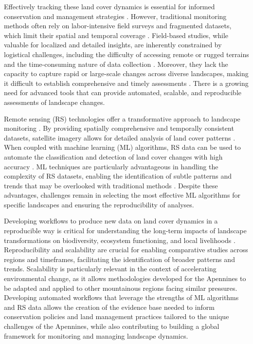 \documentclass[remotesensing,article,submit,pdftex,moreauthors]{Definitions/mdpi}
\begin{document}
Effectively tracking these land cover dynamics is essential for informed conservation and management strategies \cite{gutman2004land, AMICI201738}. However, traditional monitoring methods often rely on labor-intensive field surveys and fragmented datasets, which limit their spatial and temporal coverage \cite{Lelli2018,Lelli,GLASER2024108798}. Field-based studies, while valuable for localized and detailed insights, are inherently constrained by logistical challenges, including the difficulty of accessing remote or rugged terrains and the time-consuming nature of data collection \cite{Alessi,a16060303}. Moreover, they lack the capacity to capture rapid or large-scale changes across diverse landscapes, making it difficult to establish comprehensive and timely assessments \cite{Knollova2024,constrmater3010008}. There is a growing need for advanced tools that can provide automated, scalable, and reproducible assessments of landscape changes.

Remote sensing (RS) technologies offer a transformative approach to landscape monitoring \cite{BALDO2023101922,ZHU2022113266,earth5030024}. By providing spatially comprehensive and temporally consistent datasets, satellite imagery allows for detailed analysis of land cover patterns \cite{ANSELMETTO2024104973,BRACCHETTI2012157,jmse12081279}. When coupled with machine learning (ML) algorithms, RS data can be used to automate the classification and detection of land cover changes with high accuracy \cite{w16081141}. ML techniques are particularly advantageous in handling the complexity of RS datasets, enabling the identification of subtle patterns and trends that may be overlooked with traditional methods \cite{BAOPHAM202417,jmse12050709}. Despite these advantages, challenges remain in selecting the most effective ML algorithms for specific landscapes and ensuring the reproducibility of analyses.

Developing workflows to produce new data on land cover dynamics in a reproducible way is critical for understanding the long-term impacts of landscape transformations on biodiversity, ecosystem functioning, and local livelihoods \cite{Kuemmerle_2016}. Reproducibility and scalability are crucial for enabling comparative studies across regions and timeframes, facilitating the identification of broader patterns and trends. Scalability is particularly relevant in the context of accelerating environmental change, as it allows methodologies developed for the Apennines to be adapted and applied to other mountainous regions facing similar pressures. Developing automated workflows that leverage the strengths of ML algorithms and RS data allows the creation of the evidence base needed to inform conservation policies and land management practices tailored to the unique challenges of the Apennines, while also contributing to building a global framework for monitoring and managing landscape dynamics.
\end{document}
